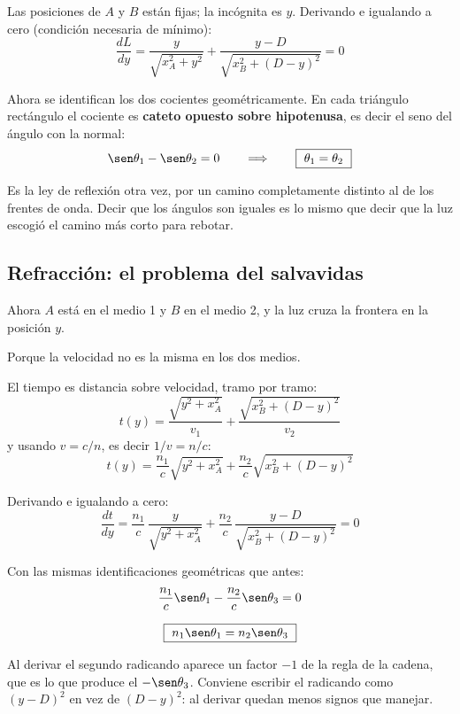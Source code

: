 \documentclass[12pt,a4paper]{article}
\begin{document}
Las posiciones de $A$ y $B$ están fijas; la incógnita es $y$. Derivando e
igualando a cero (condición necesaria de mínimo):
\[
\frac{dL}{dy} = \frac{y}{\sqrt{x_A^2 + y^2}}
              + \frac{y - D}{\sqrt{x_B^2 + (D-y)^2}} = 0
\]

Ahora se identifican los dos cocientes geométricamente. En cada triángulo
rectángulo el cociente es \textbf{cateto opuesto sobre hipotenusa}, es decir el
seno del ángulo con la normal:
\[
\sen\theta_1 - \sen\theta_2 = 0
\qquad\Longrightarrow\qquad
\boxed{\ \theta_1 = \theta_2\ }
\]

\begin{notebox}
Es la ley de reflexión otra vez, por un camino completamente distinto al de los
frentes de onda. Decir que los ángulos son iguales es lo mismo que decir que la
luz escogió el camino más corto para rebotar.
\end{notebox}

\subsection{Refracción: el problema del salvavidas}

Ahora $A$ está en el medio 1 y $B$ en el medio 2, y la luz cruza la frontera en la
posición $y$.

\begin{warnbox}
Porque la velocidad no es la misma en los dos medios.
\end{warnbox}

El tiempo es distancia sobre velocidad, tramo por tramo:
\[
t(y) = \frac{\sqrt{y^2 + x_A^2}}{v_1}
     + \frac{\sqrt{x_B^2 + (D-y)^2}}{v_2}
\]
y usando $v = c/n$, es decir $1/v = n/c$:
\[
t(y) = \frac{n_1}{c}\sqrt{y^2 + x_A^2}
     + \frac{n_2}{c}\sqrt{x_B^2 + (D-y)^2}
\]

Derivando e igualando a cero:
\[
\frac{dt}{dy} = \frac{n_1}{c}\,\frac{y}{\sqrt{y^2 + x_A^2}}
              + \frac{n_2}{c}\,\frac{y - D}{\sqrt{x_B^2 + (D-y)^2}} = 0
\]

Con las mismas identificaciones geométricas que antes:
\[
\frac{n_1}{c}\sen\theta_1 - \frac{n_2}{c}\sen\theta_3 = 0
\]

\begin{keybox}
\[
\boxed{\ n_1 \sen\theta_1 = n_2 \sen\theta_3\ }
\]
\end{keybox}

\begin{warnbox}
Al derivar el segundo radicando aparece un factor $-1$ de la regla de la cadena,
que es lo que produce el $-\sen\theta_3$. Conviene escribir el radicando como
$(y-D)^2$ en vez de $(D-y)^2$: al derivar quedan menos signos que manejar.
\end{warnbox}
\end{document}
